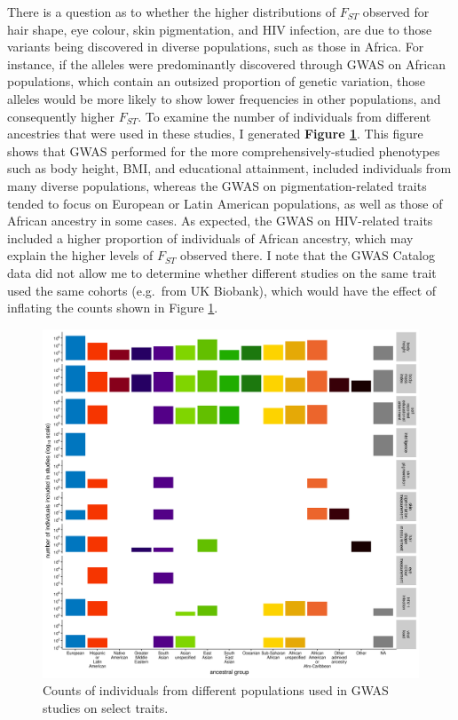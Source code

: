 \documentclass[
]{book}
\begin{document}
There is a question as to whether the higher distributions of \(F_{ST}\) observed for hair shape, eye colour, skin pigmentation, and HIV infection, are due to those variants being discovered in diverse populations, such as those in Africa. For instance, if the alleles were predominantly discovered through GWAS on African populations, which contain an outsized proportion of genetic variation, those alleles would be more likely to show lower frequencies in other populations, and consequently higher \(F_{ST}\). To examine the number of individuals from different ancestries that were used in these studies, I generated \textbf{Figure \ref{fig:fst-n-indivs}}. This figure shows that GWAS performed for the more comprehensively-studied phenotypes such as body height, BMI, and educational attainment, included individuals from many diverse populations, whereas the GWAS on pigmentation-related traits tended to focus on European or Latin American populations, as well as those of African ancestry in some cases. As expected, the GWAS on HIV-related traits included a higher proportion of individuals of African ancestry, which may explain the higher levels of \(F_{ST}\) observed there. I note that the GWAS Catalog data did not allow me to determine whether different studies on the same trait used the same cohorts (e.g.~from UK Biobank), which would have the effect of inflating the counts shown in Figure \ref{fig:fst-n-indivs}.



\begin{figure}
\includegraphics[width=1\linewidth]{figs/fst/20220324_n_individuals} \caption{Counts of individuals from different populations used in GWAS studies on select traits.}\label{fig:fst-n-indivs}
\end{figure}
\end{document}
